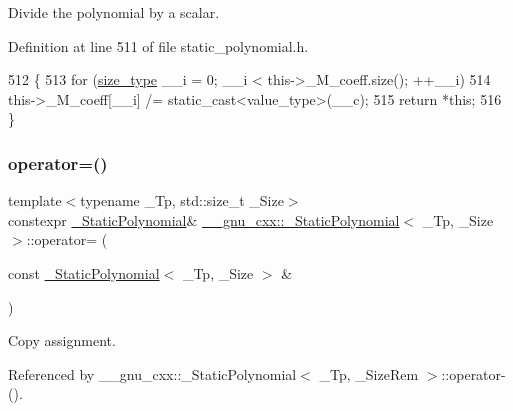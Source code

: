 Divide the polynomial by a scalar. 

Definition at line 511 of file static\+\_\+polynomial.\+h.


\begin{DoxyCode}
512       \{
513         \textcolor{keywordflow}{for} (\hyperlink{class____gnu__cxx_1_1__StaticPolynomial_a0cc0aa4adab35686ef2474e07f511ff9}{size\_type} \_\_i = 0; \_\_i < this->\_M\_coeff.size(); ++\_\_i)
514           this->\_M\_coeff[\_\_i] /= static\_cast<value\_type>(\_\_c);
515         \textcolor{keywordflow}{return} *\textcolor{keyword}{this};
516       \}
\end{DoxyCode}
\mbox{\label{class____gnu__cxx_1_1__StaticPolynomial_ae494f0196ebbf520a47153f3ba53a315}} 
\subsubsection{\texorpdfstring{operator=()}{operator=()}\hspace{0.1cm}{\footnotesize\ttfamily [1/3]}}
{\footnotesize\ttfamily template$<$typename \+\_\+\+Tp, std\+::size\+\_\+t \+\_\+\+Size$>$ \\
constexpr \hyperlink{class____gnu__cxx_1_1__StaticPolynomial}{\+\_\+\+Static\+Polynomial}\& \hyperlink{class____gnu__cxx_1_1__StaticPolynomial}{\+\_\+\+\_\+gnu\+\_\+cxx\+::\+\_\+\+Static\+Polynomial}$<$ \+\_\+\+Tp, \+\_\+\+Size $>$\+::operator= (\begin{DoxyParamCaption}\item[{const \hyperlink{class____gnu__cxx_1_1__StaticPolynomial}{\+\_\+\+Static\+Polynomial}$<$ \+\_\+\+Tp, \+\_\+\+Size $>$ \&}]{ }\end{DoxyParamCaption})\hspace{0.3cm}{\ttfamily [default]}}

Copy assignment. 

Referenced by \+\_\+\+\_\+gnu\+\_\+cxx\+::\+\_\+\+Static\+Polynomial$<$ \+\_\+\+Tp, \+\_\+\+Size\+Rem $>$\+::operator-\/().

\mbox{\label{class____gnu__cxx_1_1__StaticPolynomial_a775ee2f930b16602e467282603f965c1}} 

